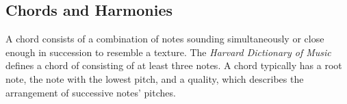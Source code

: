 \subsection{Chords and Harmonies}

A chord consists of a combination of notes sounding simultaneously or close enough in succession to resemble a texture. The \textit{Harvard Dictionary of Music} defines a chord of consisting of at least three notes. A chord typically has a root note, the note with the lowest pitch, and a quality, which describes the arrangement of successive notes' pitches.